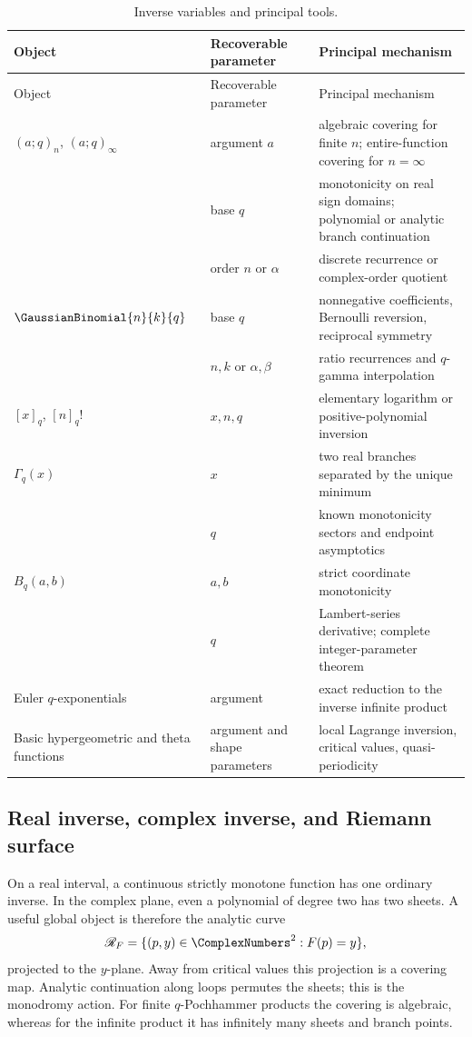 \documentclass[11pt,oneside]{article}
\theoremstyle{definition}
\theoremstyle{remark}
\theoremstyle{plain}
\theoremstyle{definition}
\theoremstyle{remark}
\numberwithin{equation}{section}
\numberwithin{figure}{section}
\numberwithin{table}{section}
\let\reportsubsection\subsection
\let\reportsubsubsection\subsubsection
\let\section\reportsubsection
\let\subsection\reportsubsubsection
\begin{document}
\begin{longtable}{@{}>{\raggedright\arraybackslash}p{}
                         >{\raggedright\arraybackslash}p{}
                         >{\raggedright\arraybackslash}p{}@{}}
\caption{Inverse variables and principal tools.}\label{tab:objects-variables}\\
\toprule
Object & Recoverable parameter & Principal mechanism\\
\midrule
\endfirsthead
\toprule
Object & Recoverable parameter & Principal mechanism\\
\midrule
\endhead
\((a;q)_n\), \((a;q)_\infty\) & argument \(a\) & algebraic covering for finite \(n\); entire-function covering for \(n=\infty\)\\
& base \(q\) & monotonicity on real sign domains; polynomial or analytic branch continuation\\
& order \(n\) or \(\alpha\) & discrete recurrence or complex-order quotient\\[0.2em]
\(\GaussianBinomial{n}{k}{q}\) & base \(q\) & nonnegative coefficients, Bernoulli reversion, reciprocal symmetry\\
& \(n,k\) or \(\alpha,\beta\) & ratio recurrences and \(q\)-gamma interpolation\\[0.2em]
\([x]_q\), \([n]_q!\) & \(x,n,q\) & elementary logarithm or positive-polynomial inversion\\[0.2em]
\(\Gamma_q(x)\) & \(x\) & two real branches separated by the unique minimum\\
& \(q\) & known monotonicity sectors and endpoint asymptotics\\[0.2em]
\(B_q(a,b)\) & \(a,b\) & strict coordinate monotonicity\\
& \(q\) & Lambert-series derivative; complete integer-parameter theorem\\[0.2em]
Euler \(q\)-exponentials & argument & exact reduction to the inverse infinite product\\[0.2em]
Basic hypergeometric and theta functions & argument and shape parameters & local Lagrange inversion, critical values, quasi-periodicity\\
\bottomrule
\end{longtable}

\section{Real inverse, complex inverse, and Riemann surface}
On a real interval, a continuous strictly monotone function has one ordinary
inverse.  In the complex plane, even a polynomial of degree two has two sheets.
A useful global object is therefore the analytic curve
\[
 \mathscr R_F=\{(p,y)\in\ComplexNumbers^2:F(p)=y\},
\]
projected to the \(y\)-plane.  Away from critical values this projection is a
covering map.  Analytic continuation along loops permutes the sheets; this is
the monodromy action.  For finite \(q\)-Pochhammer products the covering is
algebraic, whereas for the infinite product it has infinitely many sheets and
branch points.
\end{document}
